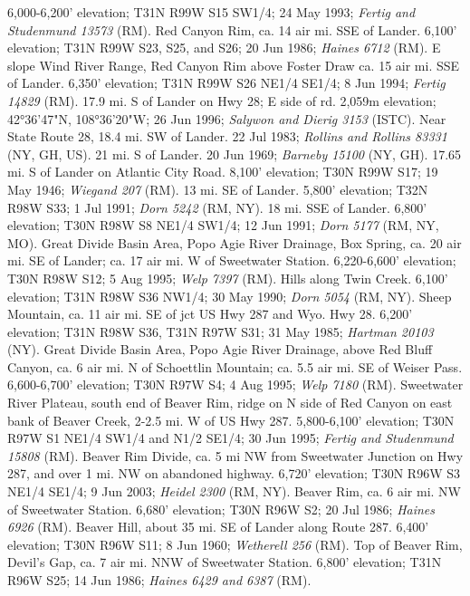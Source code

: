 6,000-6,200' elevation; T31N R99W S15 SW1/4; 24 May 1993;
\textit{Fertig and Studenmund 13573} (RM).
Red Canyon Rim, ca. 14 air mi. SSE of Lander. 6,100' elevation; T31N R99W S23,
S25, and S26; 20 Jun 1986; \textit{Haines 6712} (RM).
E slope Wind River Range, Red Canyon Rim above Foster Draw ca. 15 air mi. SSE
of Lander.  6,350' elevation; T31N R99W S26 NE1/4 SE1/4; 8 Jun 1994;
\textit{Fertig 14829} (RM).
17.9 mi. S of Lander on Hwy 28; E side of rd. 2,059m elevation;
42°36'47"N, 108°36'20"W; 26 Jun 1996; \textit{Salywon and Dierig 3153} (ISTC).
Near State Route 28, 18.4 mi. SW of Lander. 22 Jul 1983;
\textit{Rollins and Rollins 83331} (NY, GH, US).
21 mi. S of Lander. 20 Jun 1969; \textit{Barneby 15100} (NY, GH).
17.65 mi. S of Lander on Atlantic City Road. 8,100' elevation; T30N R99W S17;
19 May 1946; \textit{Wiegand 207} (RM).
13 mi. SE of Lander. 5,800' elevation; T32N R98W S33; 1 Jul 1991;
\textit{Dorn 5242} (RM, NY).
18 mi. SSE of Lander. 6,800' elevation; T30N R98W S8 NE1/4 SW1/4; 12 Jun 1991;
\textit{Dorn 5177} (RM, NY, MO).
Great Divide Basin Area, Popo Agie River Drainage, Box Spring, ca. 20 air mi.
SE of Lander; ca. 17 air mi. W of Sweetwater Station. 6,220-6,600' elevation;
T30N R98W S12; 5 Aug 1995; \textit{Welp 7397} (RM).
Hills along Twin Creek. 6,100' elevation; T31N R98W S36 NW1/4; 30 May 1990;
\textit{Dorn 5054} (RM, NY).
Sheep Mountain, ca. 11 air mi. SE of jct US Hwy 287 and Wyo. Hwy 28.
6,200' elevation; T31N R98W S36, T31N R97W S31; 31 May 1985;
\textit{Hartman 20103} (NY).
Great Divide Basin Area, Popo Agie River Drainage, above Red Bluff Canyon, ca.
6 air mi. N of Schoettlin Mountain; ca. 5.5 air mi. SE of Weiser Pass.
6,600-6,700' elevation; T30N R97W S4; 4 Aug 1995; \textit{Welp 7180} (RM).
Sweetwater River Plateau, south end of Beaver Rim, ridge on N side of Red Canyon
on east bank of Beaver Creek, 2-2.5 mi. W of US Hwy 287. 5,800-6,100' elevation;
T30N R97W S1 NE1/4 SW1/4 and N1/2 SE1/4; 30 Jun 1995;
\textit{Fertig and Studenmund 15808} (RM).
Beaver Rim Divide, ca. 5 mi NW from Sweetwater Junction on Hwy 287, and over 1
mi. NW on abandoned highway. 6,720' elevation; T30N R96W S3 NE1/4 SE1/4;
9 Jun 2003; \textit{Heidel 2300} (RM, NY).
Beaver Rim, ca. 6 air mi. NW of Sweetwater Station. 6,680' elevation;
T30N R96W S2; 20 Jul 1986; \textit{Haines 6926} (RM).
Beaver Hill, about 35 mi. SE of Lander along Route 287. 6,400' elevation;
T30N R96W S11; 8 Jun 1960; \textit{Wetherell 256} (RM).
Top of Beaver Rim, Devil's Gap, ca. 7 air mi. NNW of Sweetwater Station.
6,800' elevation; T31N R96W S25; 14 Jun 1986;
\textit{Haines 6429 and 6387} (RM).
